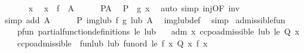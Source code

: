 \begin{isabellebody}
\ \ \ \ \isamarkupfalse%
\ x\ \isamarkupfalse%
\ {\isachardoublequoteopen}x\ {\isasymin}\ f\ {\isacharbackquote}{\kern0pt}\ A{\isachardoublequoteclose}\isanewline
\ \ \ \ \isamarkupfalse%
\ P{\isacharunderscore}{\kern0pt}A\ \isamarkupfalse%
\ {\isachardoublequoteopen}{\isacharparenleft}{\kern0pt}P\ {\isasymcirc}\ g{\isacharparenright}{\kern0pt}\ x{\isachardoublequoteclose}\ \isamarkupfalse%
\ {\isacharparenleft}{\kern0pt}auto\ simp{\isacharcolon}{\kern0pt}\ inj{\isacharbrackleft}{\kern0pt}OF\ inv{\isacharbrackright}{\kern0pt}{\isacharparenright}{\kern0pt}\isanewline
\ \ \isamarkupfalse%
{\isacharparenleft}{\kern0pt}simp\ add{\isacharcolon}{\kern0pt}\ {\isacartoucheopen}A\ {\isasymnoteq}\ {\isacharbraceleft}{\kern0pt}{\isacharbraceright}{\kern0pt}{\isacartoucheclose}{\isacharparenright}{\kern0pt}\isanewline
\ \ \isamarkupfalse%
\ {\isachardoublequoteopen}P\ {\isacharparenleft}{\kern0pt}img{\isacharunderscore}{\kern0pt}lub\ f\ g\ lub\ A{\isacharparenright}{\kern0pt}{\isachardoublequoteclose}\ \isamarkupfalse%
\ img{\isacharunderscore}{\kern0pt}lub{\isacharunderscore}{\kern0pt}def\ \isamarkupfalse%
\ simp\isanewline
{}\isamarkupfalse%
%
\endisatagproof
{\isafoldproof}%
%
\isadelimproof
\isanewline
%
\endisadelimproof
\isanewline
{}\isamarkupfalse%
\ admissible{\isacharunderscore}{\kern0pt}fun{\isacharcolon}{\kern0pt}\isanewline
\ \ \ pfun{\isacharcolon}{\kern0pt}\ {\isachardoublequoteopen}partial{\isacharunderscore}{\kern0pt}function{\isacharunderscore}{\kern0pt}definitions\ le\ lub{\isachardoublequoteclose}\isanewline
\ \ \ adm{\isacharcolon}{\kern0pt}\ {\isachardoublequoteopen}{\isasymAnd}x{\isachardot}{\kern0pt}\ ccpo{\isachardot}{\kern0pt}admissible\ lub\ le\ {\isacharparenleft}{\kern0pt}Q\ x{\isacharparenright}{\kern0pt}{\isachardoublequoteclose}\isanewline
\ \ \ {\isachardoublequoteopen}ccpo{\isachardot}{\kern0pt}admissible\ \ {\isacharparenleft}{\kern0pt}fun{\isacharunderscore}{\kern0pt}lub\ lub{\isacharparenright}{\kern0pt}\ {\isacharparenleft}{\kern0pt}fun{\isacharunderscore}{\kern0pt}ord\ le{\isacharparenright}{\kern0pt}\ {\isacharparenleft}{\kern0pt}{\isasymlambda}f{\isachardot}{\kern0pt}\ {\isasymforall}x{\isachardot}{\kern0pt}\ Q\ x\ {\isacharparenleft}{\kern0pt}f\ x{\isacharparenright}{\kern0pt}{\isacharparenright}{\kern0pt}{\isachardoublequoteclose}\isanewline
%
\isadelimproof
%
\endisadelimproof
%
\isatagproof

\end{isabellebody}
